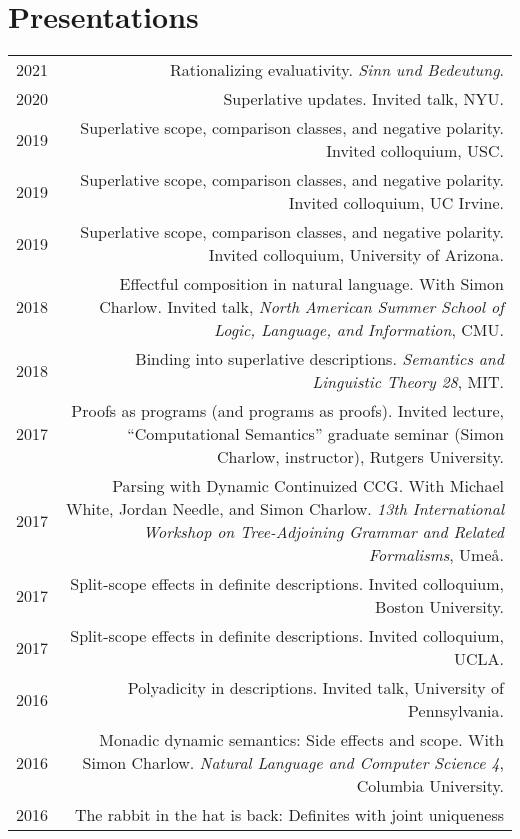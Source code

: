 \documentclass[12pt]{article}
\begin{document}
\medskip

\section*{Presentations}

\begin{longtable}{LR}
  2021 & Rationalizing evaluativity.
         \textit{Sinn und Bedeutung}.\\
  2020 & Superlative updates.
         Invited talk, NYU.\\
  2019 & Superlative scope, comparison classes, and negative polarity.
         Invited colloquium, USC.\\
  2019 & Superlative scope, comparison classes, and negative polarity.
         Invited colloquium, UC Irvine.\\
  2019 & Superlative scope, comparison classes, and negative polarity.
         Invited colloquium, University of Arizona.\\
  2018 & Effectful composition in natural language.
         With Simon Charlow.
         Invited talk, \textit{North American Summer School of Logic, Language,
         and Information}, CMU.\\
  2018 & Binding into superlative descriptions.
         \textit{Semantics and Linguistic Theory 28}, MIT.\\
  2017 & Proofs as programs (and programs as proofs).
         Invited lecture, ``Computational Semantics''
         graduate seminar (Simon Charlow, instructor), Rutgers University.\\
  2017 & Parsing with Dynamic Continuized CCG.
         With Michael White, Jordan Needle, and Simon Charlow.
         \textit{13th International Workshop on Tree-Adjoining Grammar and
         Related Formalisms}, Ume\aa.\\
  2017 & Split-scope effects in definite descriptions.
         Invited colloquium, Boston University.\\
  2017 & Split-scope effects in definite descriptions.
         Invited colloquium, UCLA.\\
  2016 & Polyadicity in descriptions.
         Invited talk, University of Pennsylvania.\\
  2016 & Monadic dynamic semantics: Side effects and scope.
         With Simon Charlow.
         \textit{Natural Language and Computer Science 4}, Columbia University.\\
  2016 & The rabbit in the hat is back: Definites with joint uniqueness

\end{longtable}
\end{document}
